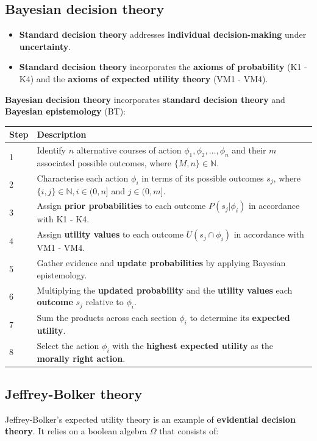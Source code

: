 \documentclass[11pt]{article}
\begin{document}
 \newpage
\subsection{Bayesian decision theory}
\label{sec:org5d4bab5}
\begin{itemize}
\item \textbf{Standard decision theory} addresses \textbf{individual decision-making} under \textbf{uncertainty}.
\item \textbf{Standard decision theory} incorporates the \textbf{axioms of probability} (K1 - K4) and the \textbf{axioms of expected utility theory} (VM1 - VM4).
\end{itemize}

\textbf{Bayesian decision theory} incorporates \textbf{standard decision theory} and \textbf{Bayesian epistemology} (BT):
\begin{center}
\begin{tabular}{|m{2em}|m{28em}|}
\hline
Step & Description\\
\hline
1 & Identify \(n\) alternative courses of action \(\phi_1, \phi_2, \ldots, \phi_n\) and their \(m\) associated possible outcomes, where \(\{M, n\} \in \mathbb{N}\).\\
\hline
2 & Characterise each action \(\phi_i\) in terms of its possible outcomes \(s_j\), where \(\{i, j\} \in \mathbb{N}, i \in (0, n]\) and \(j \in (0, m]\).\\
\hline
3 & Assign \textbf{prior probabilities} to each outcome \(P(s_j \vert \phi_i)\) in accordance with K1 - K4.\\
\hline
4 & Assign \textbf{utility values} to each outcome \(U(s_j \cap \phi_i)\) in accordance with VM1 - VM4.\\
\hline
5 & Gather evidence and \textbf{update probabilities} by applying Bayesian epistemology.\\
\hline
6 & Multiplying the \textbf{updated probability} and the \textbf{utility values} each \textbf{outcome} \(s_j\) relative to \(\phi_i\).\\
\hline
7 & Sum the products across each section \(\phi_i\) to determine its \textbf{expected utility}.\\
\hline
8 & Select the action \(\phi_i\) with the \textbf{highest expected utility} as the \textbf{morally right action}.\\
\hline
\end{tabular}
\end{center}
\subsection{Jeffrey-Bolker theory}
\label{sec:org123cc71}
Jeffrey-Bolker's expected utility theory is an example of \textbf{evidential decision theory}. It relies on a boolean algebra \(\Omega\) that consists of:
\end{document}

